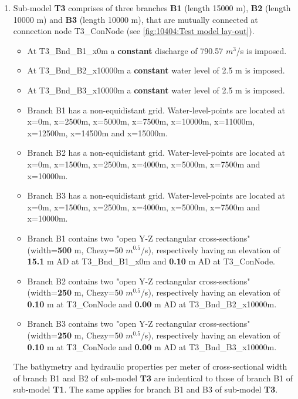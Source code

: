 \begin{enumerate}
	\item Sub-model \textbf{\textcolor[rgb]{1,0,0}{T3}} comprises of three branches \textbf{B1} (length 15000 m), \textbf{B2} (length 10000 m) and \textbf{B3} (length 10000 m), that are mutually connected at connection node T3\_ConNode (see \autoref{fig:10404:Test model lay-out}).
		\begin{itemize}
			\item At T3\_Bnd\_B1\_x0m a \textbf{constant} discharge of 790.57 $m^3$/s is imposed.
			\item At T3\_Bnd\_B2\_x10000m a \textbf{constant} water level of 2.5 m is imposed.
			\item At T3\_Bnd\_B3\_x10000m a \textbf{constant} water level of 2.5 m is imposed.		
			\item Branch B1 has a non-equidistant grid. Water-level-points are located at x=0m, x=2500m, x=5000m, x=7500m, x=10000m, x=11000m, x=12500m, x=14500m and x=15000m.
			\item Branch B2 has a non-equidistant grid. Water-level-points are located at x=0m, x=1500m, x=2500m, x=4000m, x=5000m, x=7500m and x=10000m.
			\item Branch B3 has a non-equidistant grid. Water-level-points are located at x=0m, x=1500m, x=2500m, x=4000m, x=5000m, x=7500m and x=10000m.
			\item Branch B1 contains two "open Y-Z rectangular cross-sections" (width=\textbf{\textcolor[rgb]{0.5,0,0.15}{500}} m, Chezy=50 $m^{0.5}$/s), respectively having an elevation of \textbf{15.1} m AD at T3\_Bnd\_B1\_x0m and \textbf{0.10} m AD at T3\_ConNode. 
			\item Branch B2 contains two "open Y-Z rectangular cross-sections" (width=\textbf{\textcolor[rgb]{0.5,0,0.15}{250}} m, Chezy=50 $m^{0.5}$/s), respectively having an elevation of \textbf{0.10} m at T3\_ConNode and \textbf{0.00} m AD at \newline T3\_Bnd\_B2\_x10000m.
			\item Branch B3 contains two "open Y-Z rectangular cross-sections" (width=\textbf{\textcolor[rgb]{0.5,0,0.15}{250}} m, Chezy=50 $m^{0.5}$/s), respectively having an elevation of \textbf{0.10} m at T3\_ConNode and \textbf{0.00} m AD at \newline T3\_Bnd\_B3\_x10000m.
		\end{itemize} 
			
		\Note The bathymetry and hydraulic properties per meter of cross-sectional width of branch B1 and B2 of sub-model \textbf{\textcolor[rgb]{1,0,0}{T3}} are indentical to those of branch B1 of sub-model \textbf{\textcolor[rgb]{1,0,0}{T1}}. The same applies for branch B1 and B3 of sub-model \textbf{\textcolor[rgb]{1,0,0}{T3}}.\\
	

\end{enumerate}
